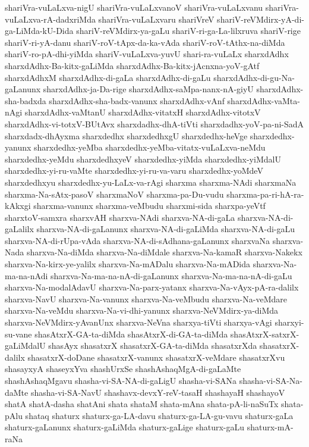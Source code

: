 {shariVra-vuLaLxva-nigU
shariVra-vuLaLxvanoV
shariVra-vuLaLxvanu
shariVra-vuLaLxva-rA-dadxriMda
shariVra-vuLaLxvaru
shariVreV
shariV-reVMdirx-yA-di-ga-LiMda-kU-Dida
shariV-reVMdirx-ya-gaLu
shariV-ri-ga-La-lilxruva
shariV-rige
shariV-ri-yA-danu
shariV-roV-tApx-da-ka-vAda
shariV-roV-tAthx-na-diMda
shariV-ro-pA-dhi-yiMda
shariV-vuLaLxva-yuvU
shari-ra-vuLaLx
sharxdAdhx
sharxdAdhx-Ba-kitx-gaLiMda
sharxdAdhx-Ba-kitx-jAcnxna-yoV-gAtf
sharxdAdhxM
sharxdAdhx-di-gaLa
sharxdAdhx-di-gaLu
sharxdAdhx-di-gu-Na-gaLanunx
sharxdAdhx-ja-Da-rige
sharxdAdhx-saMpa-nanx-nA-giyU
sharxdAdhx-sha-badxda
sharxdAdhx-sha-badx-vanunx
sharxdAdhx-vAnf
sharxdAdhx-vaMta-nAgi
sharxdAdhx-vaMtanU
sharxdAdhx-vitatxH
sharxdAdhx-vitotxV
sharxdAdhx-vi-totxV-BUtAvx
sharxdadhx-dhA-tiVti
sharxdadhx-yoV-pa-ni-SadA
sharxdadx-dhAyxma
sharxdedhx
sharxdedhxgU
sharxdedhx-heVge
sharxdedhx-yanunx
sharxdedhx-yeMba
sharxdedhx-yeMba-vitatx-vuLaLxva-neMdu
sharxdedhx-yeMdu
sharxdedhxyeV
sharxdedhx-yiMda
sharxdedhx-yiMdalU
sharxdedhx-yi-ru-vaMte
sharxdedhx-yi-ru-va-varu
sharxdedhx-yoMdeV
sharxdedhxyu
sharxdedhx-yu-LaLx-va-rAgi
sharxma
sharxma-NAdi
sharxmaNa
sharxma-Na-sAtx-pasoV
sharxmaNoV
sharxma-pa-Du-vudu
sharxma-pa-ri-hA-ra-kAkxgi
sharxma-vanunx
sharxma-veMbudu
sharxmi-sida
sharxpa-yeVtf
sharxtoV-samxra
sharxvAH
sharxva-NAdi
sharxva-NA-di-gaLa
sharxva-NA-di-gaLalilx
sharxva-NA-di-gaLanunx
sharxva-NA-di-gaLiMda
sharxva-NA-di-gaLu
sharxva-NA-di-rUpa-vAda
sharxva-NA-di-sAdhana-gaLanunx
sharxvaNa
sharxva-Nada
sharxva-Na-diMda
sharxva-Na-diMdale
sharxva-Na-kamaR
sharxva-Nakekx
sharxva-Na-kirx-ye-yalilx
sharxva-Na-mADalu
sharxva-Na-mADida
sharxva-Na-ma-na-nAdi
sharxva-Na-ma-na-nA-di-gaLanunx
sharxva-Na-ma-na-nA-di-gaLu
sharxva-Na-modalAdavU
sharxva-Na-parx-yatanx
sharxva-Na-vAyx-pA-ra-dalilx
sharxva-NavU
sharxva-Na-vanunx
sharxva-Na-veMbudu
sharxva-Na-veMdare
sharxva-Na-veMdu
sharxva-Na-vi-dhi-yanunx
sharxva-NeVMdirx-ya-diMda
sharxva-NeVMdirx-yAvanUnx
sharxva-NeVna
sharxya-tiVti
sharxya-vAgi
sharxyi-su-vane
shasAtxrX-GA-ta-diMda
shasAtxrX-di-GA-ta-diMda
shasAtxrX-satxrX-gaLiMdalU
shasAyx
shasatxrX
shasatxrX-GA-ta-diMda
shasatxrXda
shasatxrX-dalilx
shasatxrX-doDane
shasatxrX-vanunx
shasatxrX-veMdare
shasatxrXvu
shasayxyA
shaseyxYva
shashUrxSe
shashAshaqMgA-di-gaLaMte
shashAshaqMgavu
shasha-vi-SA-NA-di-gaLigU
shasha-vi-SANa
shasha-vi-SA-Na-daMte
shasha-vi-SA-NavU
shashavx-devxY-reV-tasaH
shashayaH
shashayoV
shatA
shatA-dasha
shatAni
shata
shataM
shata-mAna
shata-pA-li-naSuTx
shata-pAlu
shataq
shaturx
shaturx-ga-LA-davu
shaturx-ga-LA-gu-vavu
shaturx-gaLa
shaturx-gaLanunx
shaturx-gaLiMda
shaturx-gaLige
shaturx-gaLu
shaturx-mA-raNa
}
